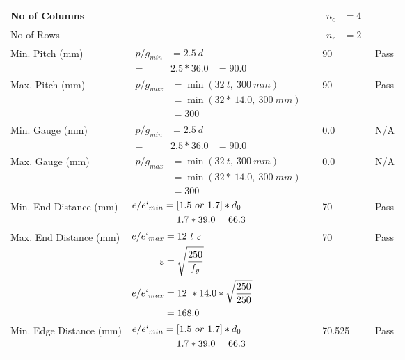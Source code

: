 \documentclass{article}%
\begin{document}
\begin{longtable}{|p{4cm}|p{5cm}|p{5.5cm}|p{1.5cm}|}
No of Columns&&$\begin{aligned} n_c &=4\end{aligned}$&\\%
\hline%
No of Rows&&$\begin{aligned} n_r &=2\end{aligned}$&\\%
\hline%
Min. Pitch (mm)&$\begin{aligned}p/g_{min}&= 2.5 ~ d&\\ =&2.5*36.0&=90.0\end{aligned}$&90&Pass\\%
\hline%
Max. Pitch (mm)&$\begin{aligned}p/g_{max} &=\min(32~t,~300~mm)&\\ &=\min(32 *~14.0,~ 300 ~mm)\\&=300\end{aligned}$&90&Pass\\%
\hline%
Min. Gauge (mm)&$\begin{aligned}p/g_{min}&= 2.5 ~ d&\\ =&2.5*36.0&=90.0\end{aligned}$&0.0&N/A\\%
\hline%
Max. Gauge (mm)&$\begin{aligned}p/g_{max} &=\min(32~t,~300~mm)&\\ &=\min(32 *~14.0,~ 300 ~mm)\\&=300\end{aligned}$&0.0&N/A\\%
\hline%
Min. End Distance (mm)&$\begin{aligned}e/e`_{min} &=[1.5~or~ 1.7] * d_0\\ &=1.7*39.0=66.3 \end{aligned}$&70&Pass\\%
\hline%
Max. End Distance (mm)&$\begin{aligned}e/e`_{max} &= 12~ t~ \varepsilon&\\ \varepsilon &= \sqrt{\frac{250}{f_y}}\\ e/e`_{max}&=12 ~*14.0*\sqrt{\frac{250}{250}}\\ &=168.0\\ \end{aligned}$&70&Pass\\%
\hline%
Min. Edge Distance (mm)&$\begin{aligned}e/e`_{min} &=[1.5~or~ 1.7] * d_0\\ &=1.7*39.0=66.3 \end{aligned}$&70.525&Pass\\%

\end{longtable}
\end{document}
